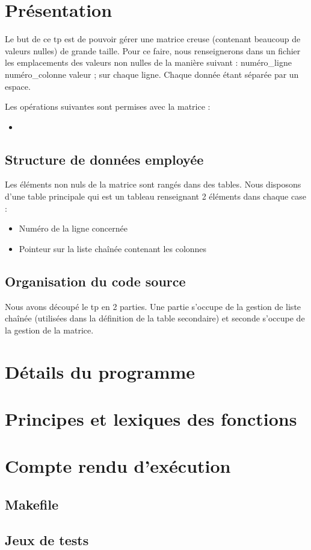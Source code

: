 \documentclass{report}
\begin{document}
  
  \tableofcontents
  \setlength{\parskip}{10pt}
  \setlength{\parindent}{0pt}
  \chapter{Présentation}
    Le but de ce tp est de pouvoir gérer une matrice creuse (contenant beaucoup de valeurs nulles) de grande taille. Pour ce faire, nous renseignerons dans un fichier les emplacements des valeurs non nulles de la manière suivant : numéro_ligne numéro_colonne valeur ; sur chaque ligne. Chaque donnée étant séparée par un espace.

    Les opérations suivantes sont permises avec la matrice :
    \begin{itemize}
      \item 
    \end{itemize}

    \section{Structure de données employée}
      Les éléments non nuls de la matrice sont rangés dans des tables. Nous disposons d'une table principale qui est un tableau renseignant 2 éléments dans chaque case :
      \begin{itemize}
        \item Numéro de la ligne concernée
        \item Pointeur sur la liste chaînée contenant les colonnes
      \end{itemize}
    
    \section{Organisation du code source}
      Nous avons découpé le tp en 2 parties. Une partie s'occupe de la gestion de liste chaînée (utilisées dans la définition de la table secondaire) et seconde s'occupe de la gestion de la matrice.

    
  \chapter{Détails du programme}
    

  \chapter{Principes et lexiques des fonctions}
    

  \chapter{Compte rendu d'exécution}
    \section{Makefile}

    \section{Jeux de tests}
%      
\end{document}
